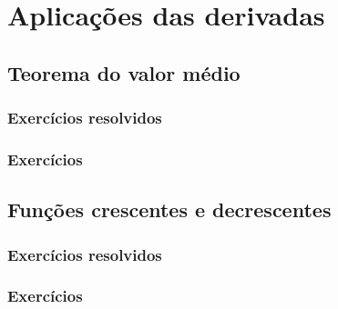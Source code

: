 
\chapter{Aplicações das derivadas}\label{cap:apl_derivadas}

\emconstrucao

\section{Teorema do valor médio}
\construirSec

\subsection*{Exercícios resolvidos}

\construirExeresol


\subsection*{Exercícios}

\construirExer


\section{Funções crescentes e decrescentes}
\construirSec

\subsection*{Exercícios resolvidos}

\construirExeresol


\subsection*{Exercícios}

\construirExer


